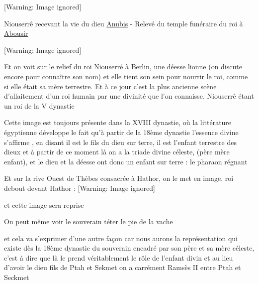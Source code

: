 \documentclass[a4paper,10pt]{article}
\begin{document}
\begin{itemize}
  [Warning: Image ignored] %
 

  [Warning: Image ignored] %
 

Niouserrê recevant la vie du dieu
\href{http://fr.wikipedia.org/wiki/Anubis}{\textcolor[rgb]{0.0,0.21960784,0.62352943}{Anubis}}
- Relevé du temple funéraire du roi à
\href{http://fr.wikipedia.org/wiki/Abousir}{\textcolor[rgb]{0.0,0.21960784,0.62352943}{Abousir}}

  [Warning: Image ignored] %
 

Et on voit  sur le relief du roi Niouserré à Berlin, une déesse lionne
(on discute encore pour connaître son nom) et elle tient son sein pour
nourrir le roi, comme si elle était sa mère terrestre. Et  à ce jour
c'est la plus ancienne scène
d'allaitement d'un roi humain par une
divinité que l'on connaisse. Niouserrê étant un roi de
la V dynastie

Cette image est toujours présente dans la XVIII dynastie, où la
littérature égyptienne développe le fait qu'à partir
de la 18ème dynastie l'essence divine
s'affirme , en disant {\textquotedbl} il est le fils
du dieu sur terre, il est l'enfant terrestre des dieux
et  à partir de ce moment là on a la triade divine céleste, (père mère
enfant),  et le dieu et la déesse ont donc un enfant sur terre : le
pharaon régnant

Et sur la rive Ouest de Thèbes consacrée à Hathor,  on le met en image,
roi debout devant Hathor :  [Warning: Image ignored]
 

 et cette image sera reprise

On peut même voir le souverain téter le pie de la vache

et cela va s'exprimer d'une autre
façon car nous aurons la représentation qui existe dès la 18ème
dynastie du souverain encadré par son père et sa mère céleste,
c'est à dire que là le prend véritablement le rôle de
l'enfant divin et au lieu d'avoir le
dieu fils de Ptah et Sekmet on a carrément Ramsès II entre Ptah et
Seckmet


\end{itemize}
\end{document}
